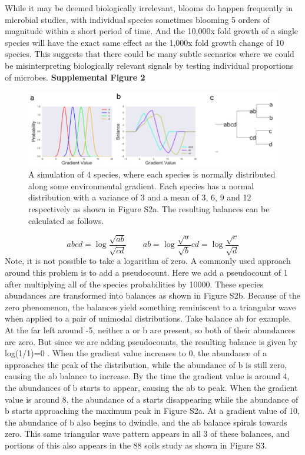 While it may be deemed biologically irrelevant, blooms do happen frequently in microbial studies, with individual species sometimes blooming 5 orders of magnitude within a short period of time.  And the 10,000x fold growth of a single species will have the exact same effect as the 1,000x fold growth change of 10 species.  This suggests that there could be many subtle scenarios where we could be misinterpreting biologically relevant signals by testing individual proportions of microbes.\newpage
\textbf{Supplemental Figure 2}\\[5 mm]
\begin{figure}[H]
        \centering
        \includegraphics[width=1\textwidth]{appendix_b/sup_figure2.png}
        \caption[An ecological intrepretation of balances]{A simulation of 4 species, where each species is normally distributed along some environmental gradient.  Each species has a normal distribution with a variance of 3 and a mean of 3, 6, 9 and 12 respectively as shown in Figure S2a.  The resulting balances can be calculated as follows.}
        \label{figbS2}
\end{figure}
\[
abcd = \log \frac{\sqrt{ab}}{\sqrt{cd}} \qquad
ab = \log \frac{\sqrt{a}}{\sqrt{b}}
cd = \log \frac{\sqrt{c}}{\sqrt{d}}
\]
Note, it is not possible to take a logarithm of zero.  A commonly used approach around this problem is to add a pseudocount.  Here we add a pseudocount of 1 after multiplying all of the species probabilities by 10000.  These species abundances are transformed into balances as shown in Figure S2b.  Because of the zero phenomenon, the balances yield something reminiscent to a triangular wave when applied to a pair of unimodal distributions.  Take balance ab for example.  At the far left around -5, neither a or b are present, so both of their abundances are zero.  But since we are adding pseudocounts, the resulting balance is given by log(1/1)=0 . When the gradient value increases to 0, the abundance of a approaches the peak of the distribution, while the abundance of b is still zero, causing the ab balance to increase.  By the time the gradient value is around 4, the abundances of b starts to appear, causing the ab to peak.  When the gradient value is around 8, the abundance of a starts disappearing while the abundance of b starts approaching the maximum peak in Figure S2a.  At a gradient value of 10, the abundance of b also begins to dwindle, and the ab balance spirals towards zero.  This same triangular wave pattern appears in all 3 of these balances, and portions of this also appears in the 88 soils study as shown in Figure S3.\\[5 mm]
